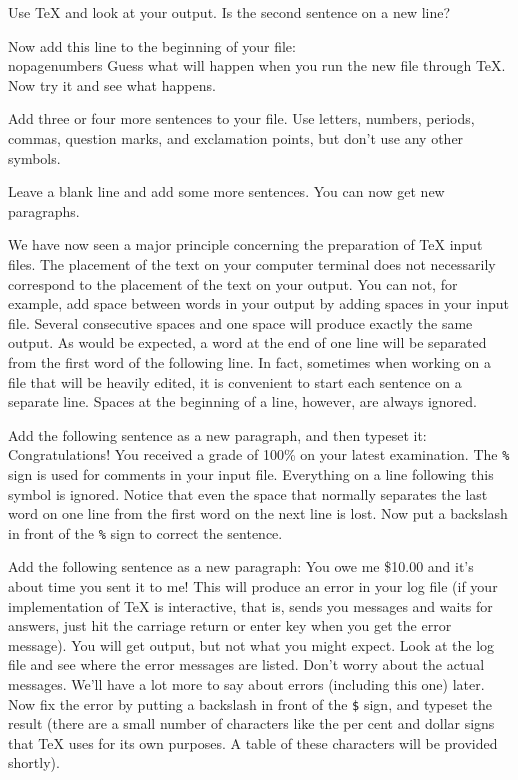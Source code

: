 Use \TeX{} and look at your output. Is the second sentence on a 
new line? 
 
 
\exercise Now add this line to the beginning of your file: 
\beginuser 
\\nopagenumbers 
\enduser 
\noindent 
Guess what will happen when you run the new file through 
\TeX\null.  Now try it and see what happens. 
 
\exercise Add three or four more sentences to your file. 
Use letters, numbers, periods, commas, question marks, 
and exclamation points, but don't use any other symbols. 
 
 
\exercise Leave a blank line and add some more sentences. 
You can now get new paragraphs. 
\medskip 
 
We have now seen a major principle concerning the preparation of 
\TeX{} input files. The placement of the text on your computer 
terminal does not necessarily correspond to the placement of the 
text on your output. You can not, for example, add space between 
words in your output by adding spaces in your input file. Several 
consecutive spaces and one space will produce exactly the same 
output. As would be expected, a word at the end of one line will 
be separated from the first word of the following line. In fact, 
sometimes when working on a file that will be heavily edited, it 
is convenient to start each sentence on a separate line. Spaces 
at the beginning of a line, however, are always ignored. 
 
\exercise Add the following sentence as a new paragraph, and then 
typeset it: 
\beginuser 
Congratulations! You received a grade of 100\% on your latest 
examination. 
\enduser 
\noindent 
The {\tt\%} sign is used for comments in your input file. 
Everything on a line following this symbol is ignored. Notice 
that even the space that normally separates the last word on one 
line from the first word on the next line is lost. Now put a 
backslash in front of the {\tt\%} sign to correct the 
sentence. \toindex{\$} \toindex{\%} 
 
\exercise Add the following sentence as a new paragraph: 
\beginuser 
You owe me \$10.00 and it's about time you sent it to me! 
\enduser 
\noindent 
This will produce an error in your log file (if your 
implementation of \TeX{} is interactive, that is, sends you 
messages and waits for answers, just hit the carriage return or 
enter key when you get the error message). You will get output, 
but not what you might expect. Look at the log file and see 
where the error messages are listed. Don't worry about the 
actual messages. We'll have a lot more to say about errors 
(including this one) later. Now fix the error by putting a 
backslash in front of the {\tt \$} sign, and typeset the result 
(there are a small number of characters like the per cent and 
dollar signs that \TeX{} uses for its own purposes. A table of 
these characters will be provided shortly). 
 

